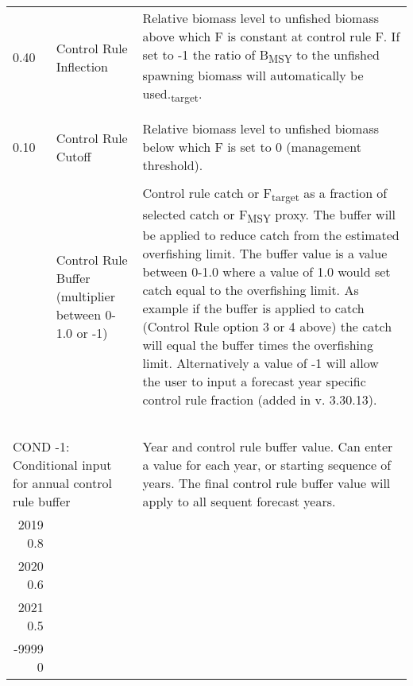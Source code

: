 \begin{landscape}
{\begin{longtable}{p{3.2cm} p{7cm} p{10.8cm}}
 0.40 \Tstrut & Control Rule Inflection & \multirow{1}{1cm}[-0.2cm]{\parbox{11cm}{Relative biomass level to unfished biomass above which F is constant at control rule F. If set to -1 the ratio of B\textsubscript{MSY} to the unfished spawning biomass will automatically be used.\textsubscript{target}.}} \Bstrut\\
   &  & \\
   &  & \\
 
 \hline
 0.10 \Tstrut & Control Rule Cutoff & \multirow{1}{1cm}[-0.2cm]{\parbox{11cm}{Relative biomass level to unfished biomass below which F is set to 0 (management threshold).}} \\
   &  & \Bstrut\\
 
 \pagebreak
 0.75 \Tstrut & Control Rule Buffer (multiplier between 0-1.0 or -1) & \multirow{1}{1cm}[-0.25cm]{\parbox{11cm}{Control rule catch or F\textsubscript{target} as a fraction of selected catch or F\textsubscript{MSY} proxy. The buffer will be applied to reduce catch from the estimated overfishing limit. The buffer value is a value between 0-1.0 where a value of 1.0 would set catch equal to the overfishing limit. As example if the buffer is applied to catch (Control Rule option 3 or 4 above) the catch will equal the buffer times the overfishing limit. Alternatively a value of -1 will allow the user to input a forecast year specific control rule fraction (added in v. 3.30.13).}} \\ 
  & & \\
  & & \\
  & & \\
  & & \\
  & & \Bstrut\\
 
  \multicolumn{2}{l}{COND -1: Conditional input for annual control rule buffer} & \multirow{1}{1cm}[-0.25cm]{\parbox{11cm}{Year and control rule buffer value. Can enter a value for each year, or starting sequence of years. The final control rule buffer value  will apply to all sequent forecast years.}} \Tstrut\\
  \multicolumn{1}{r}{2019 0.8}  & &  \\
  \multicolumn{1}{r}{2020 0.6}  & & \\ 
  \multicolumn{1}{r}{2021 0.5}  & & \\ 
  \multicolumn{1}{r}{-9999 0}   & & \Bstrut\\ 
  

\end{longtable}}
\end{landscape}
